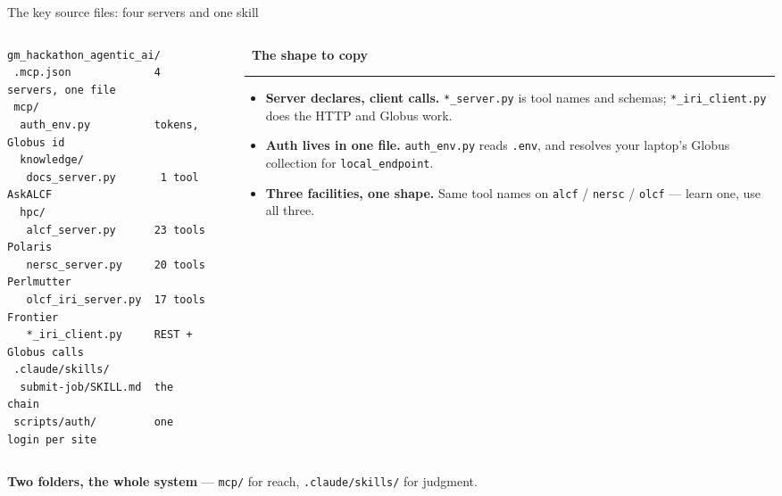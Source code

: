 \documentclass[aspectratio=169,11pt]{beamer}
\newcommand{\sechead}[2]{{\small\color{#1}\bfseries #2}\par\vspace{1.5pt}%
  {\color{#1!45}\rule{\linewidth}{0.6pt}}\par\vspace{4pt}}
\newcommand{\takeaway}[3][labnavy]{{\color{#1}\bfseries #2} #3}
\newcommand{\codetag}[2][labnavy]{%
  \par\vspace{1pt}{\scriptsize\color{#1}\bfseries #2}\par\vspace{1pt}}
\begin{document}
\begin{frame}[fragile]{The key source files: four servers and one skill}
  \begin{columns}[T,totalwidth=\textwidth]
    \begin{column}{0.53\textwidth}
      \codetag{\faFolderOpen\ what you cloned}
\begin{lstlisting}[style=plainsnip, columns=flexible, keepspaces=true]
gm_hackathon_agentic_ai/
 .mcp.json             4 servers, one file
 mcp/
  auth_env.py          tokens, Globus id
  knowledge/
   docs_server.py       1 tool  AskALCF
  hpc/
   alcf_server.py      23 tools Polaris
   nersc_server.py     20 tools Perlmutter
   olcf_iri_server.py  17 tools Frontier
   *_iri_client.py     REST + Globus calls
 .claude/skills/
  submit-job/SKILL.md  the chain
 scripts/auth/         one login per site
\end{lstlisting}
    \end{column}
    \begin{column}{0.02\textwidth}\end{column}
    \begin{column}{0.45\textwidth}
      \sechead{labnavy}{\faSitemap\ The shape to copy}
      \scriptsize
      \begin{itemize}\setlength\itemsep{3pt}
        \item[\faPlug] \textbf{Server declares, client calls.}
          \texttt{*\_server.py} is tool names and schemas;
          \texttt{*\_iri\_client.py} does the HTTP and Globus work.
        \item[\faKey] \textbf{Auth lives in one file.}
          \texttt{auth\_env.py} reads \texttt{.env}, and resolves your laptop's
          Globus collection for \texttt{local\_endpoint}.
        \item[\faClone] \textbf{Three facilities, one shape.} Same tool names
          on \texttt{alcf} / \texttt{nersc} / \texttt{olcf} --- learn one, use
          all three.
      \end{itemize}
    \end{column}
  \end{columns}
  \small
  \takeaway[accentteal]{Two folders, the whole system}{%
    --- \texttt{mcp/} for reach, \texttt{.claude/skills/} for judgment.}
\end{frame}
\end{document}
